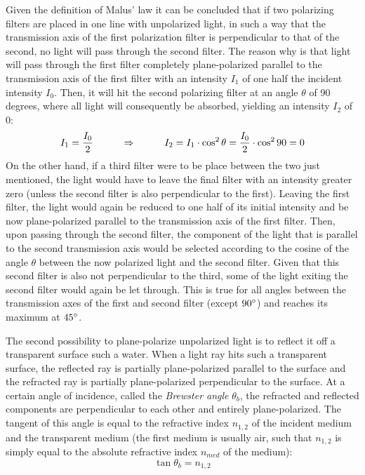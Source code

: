 Given the definition of Malus' law it can be concluded that if two polarizing filters are placed in one line with unpolarized light, in such a way that the transmission axis of the first polarization filter is perpendicular to that of the second, no light will pass through the second filter. The reason why is that light will pass through the first filter completely plane-polarized parallel to the transmission axis of the first filter with an intensity $I_1$ of one half the incident intensity $I_0$. Then, it will hit the second polarizing filter at an angle $\theta$ of 90 degrees, where all light will consequently be absorbed, yielding an intensity $I_2$ of 0: $$I_1 = \frac{I_0}{2} \hspace{1 cm} \Rightarrow \hspace{1 cm} I_2 = I_1 \cdot \cos^2 \theta = \frac{I_0}{2} \cdot \cos^2 90 = 0$$ On the other hand, if a third filter were to be place between the two just mentioned, the light would have to leave the final filter with an intensity greater zero (unless the second filter is also perpendicular to the first). Leaving the first filter, the light would again be reduced to one half of its initial intensity and be now plane-polarized parallel to the transmission axis of the first filter. Then, upon passing through the second filter, the component of the light that is parallel to the second transmission axis would be selected according to the cosine of the angle $\theta$ between the now polarized light and the second filter. Given that this second filter is also not perpendicular to the third, some of the light exiting the second filter would again be let through. This is true for all angles between the transmission axes of the first and second filter (except $90\degree$) and reaches its maximum at $45\degree$.


The second possibility to plane-polarize unpolarized light is to reflect it off a transparent surface such a water. When a light ray hits such a transparent surface, the reflected ray is partially plane-polarized parallel to the surface and the refracted ray is partially plane-polarized perpendicular to the surface. At a certain angle of incidence, called the \emph{Brewster angle} $\theta_b$, the refracted and reflected components are perpendicular to each other and entirely plane-polarized. The tangent of this angle is equal to the refractive index $n_{1, 2}$ of the incident medium and the transparent medium (the first medium is usually air, such that $n_{1,2}$ is simply equal to the absolute refractive index $n_{med}$ of the medium): $$\tan \theta_b = n_{1, 2}$$

